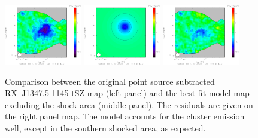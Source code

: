 	\begin{figure}	
	\centering	
	\includegraphics[width=0.3\textwidth]{Figure/RXJ1347-1145_PS_subtracted_map_2mm}
	\hspace*{0.3cm}
	\includegraphics[width=0.3\textwidth]{Figure/model}
	\hspace*{0.3cm}
	\includegraphics[width=0.3\textwidth]{Figure/residu}
	\caption{Comparison between the original point source subtracted \mbox{RX~J1347.5-1145} tSZ map (left panel) and the best fit model map excluding the shock area (middle panel). The residuals are given on the right panel map. The model accounts for the cluster emission well, except in the southern shocked area, as expected.}
        \label{fig:residual}
	\end{figure}
	